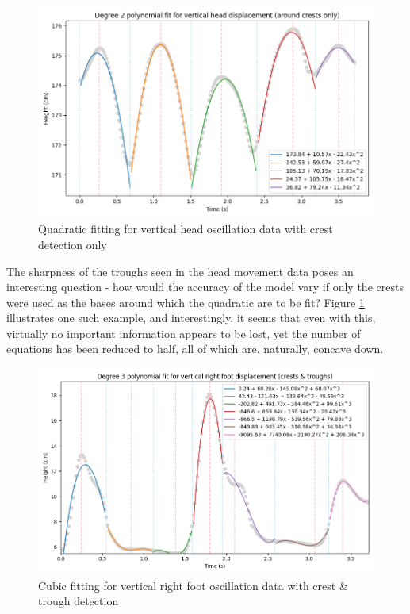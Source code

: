 \documentclass[12pt, a4paper]{article}
\begin{document}
\begin{figure}[H]
    \centering
    \includegraphics[width=14cm]{p_peaks_crestsonly_head_2.png}
    \caption{ Quadratic fitting for vertical head oscillation data with crest
        detection only }
    \label{crestsonly_head}
\end{figure}

The sharpness of the troughs seen in the head movement data poses an interesting
question - how would the accuracy of the model vary if only the crests were used
as the bases around which the quadratic are to be fit? Figure
\ref{crestsonly_head} illustrates one such example, and interestingly, it seems
that even with this, virtually no important information appears to be lost, yet
the number of equations has been reduced to half, all of which are, naturally,
concave down.

\begin{figure}[H]
    \centering
    \includegraphics[width=14cm]{p_peaks_right_3.png}
    \caption{ Cubic fitting for vertical right foot oscillation data with crest
        \& trough detection }
    \label{peaks_right}
\end{figure}
\end{document}
